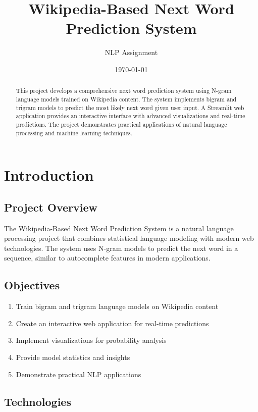 \documentclass[12pt,a4paper]{report}
\title{\textbf{Wikipedia-Based Next Word Prediction System}}
\author{NLP Assignment}
\date{\today}
\begin{document}
\maketitle

\begin{abstract}
This project develops a comprehensive next word prediction system using N-gram language models trained on Wikipedia content. The system implements bigram and trigram models to predict the most likely next word given user input. A Streamlit web application provides an interactive interface with advanced visualizations and real-time predictions. The project demonstrates practical applications of natural language processing and machine learning techniques.
\end{abstract}

\tableofcontents
\newpage

\chapter{Introduction}

\section{Project Overview}

The Wikipedia-Based Next Word Prediction System is a natural language processing project that combines statistical language modeling with modern web technologies. The system uses N-gram models to predict the next word in a sequence, similar to autocomplete features in modern applications.

\section{Objectives}

\begin{enumerate}
    \item Train bigram and trigram language models on Wikipedia content
    \item Create an interactive web application for real-time predictions
    \item Implement visualizations for probability analysis
    \item Provide model statistics and insights
    \item Demonstrate practical NLP applications
\end{enumerate}

\section{Technologies}
\end{document}
